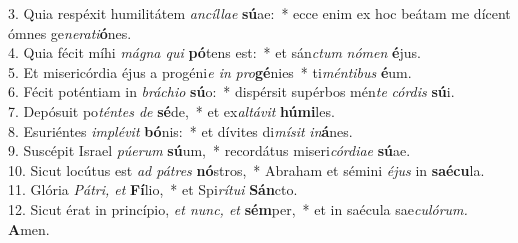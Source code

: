 3. Quia respéxit humilitátem \textit{ancíllae} \textbf{sú}ae: * ecce enim ex hoc beátam me dícent ómnes ge\textit{nerati}\textbf{ó}nes.\\
4. Quia fécit míhi \textit{mágna qui} \textbf{pó}tens est: * et sán\textit{ctum} \textit{nómen} \textbf{é}jus.\\
5. Et misericórdia éjus a progéni\textit{e in} \textit{pro}\textbf{gé}nies * ti\textit{méntibus} \textbf{é}um.\\
6. Fécit poténtiam in \textit{bráchio} \textbf{sú}o: * dispérsit supérbos mén\textit{te} \textit{cór}\textit{dis} \textbf{sú}i.\\
7. Depósuit po\textit{téntes de} \textbf{sé}de, * et ex\textit{altávit} \textbf{húmi}les.\\
8. Esuriéntes \textit{implévit} \textbf{bó}nis: * et dívites di\textit{mísit} \textit{in}\textbf{á}nes.\\
9. Suscépit Israel \textit{púerum} \textbf{sú}um, * recordátus miseri\textit{córdiae} \textbf{sú}ae.\\
10. Sicut locútus est \textit{ad pátres} \textbf{nó}stros, * Abraham et sémini \textit{éjus} in \textbf{saécu}la.\\
11. Glória \textit{Pátri, et} \textbf{Fí}lio, * et Spi\textit{rítui} \textbf{Sán}cto.\\
12. Sicut érat in princípio, \textit{et nunc, et} \textbf{sém}per, * et in saécula sae\textit{culórum.} \textbf{A}men.